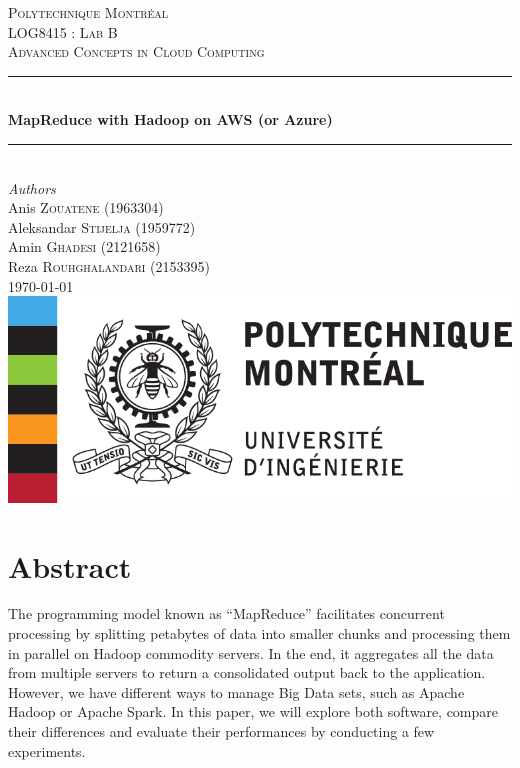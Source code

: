 \documentclass[12pt]{article}
\begin{document}
\begin{titlepage} 
	\newcommand{\HRule}{\rule{\linewidth}{0.5mm}}
	\center
	\textsc{\LARGE Polytechnique Montréal}\\[1.5cm]
	\textsc{\Large LOG8415 : Lab B}\\[0.5cm]
	\textsc{\large Advanced Concepts in Cloud Computing}\\[0.5cm]
	\HRule\\[0.4cm]
	{\huge\bfseries MapReduce with Hadoop on AWS (or Azure)}\\[0.4cm]
	\HRule\\[1.5cm]
	{\large\textit{Authors}}\\
	Anis \textsc{Zouatene} (1963304)\\
	Aleksandar \textsc{Stijelja} (1959772)\\
	Amin \textsc{Ghadesi} (2121658)\\
    Reza \textsc{Rouhghalandari} (2153395)\\
	\vfill\vfill\vfill {\large\today} \vfill\vfill
	\includegraphics{images/poly-logo.png}\\[1cm]
	\vfill
\end{titlepage}


\section{Abstract}

\noindent The programming model known as “MapReduce” facilitates concurrent processing by splitting petabytes of data into smaller chunks and processing them in parallel on Hadoop commodity servers. In the end, it aggregates all the data from multiple servers to return a consolidated output back to the application. \\
\noindent However, we have different ways to manage Big Data sets, such as Apache Hadoop or Apache Spark. In this paper, we will explore both software, compare their differences and evaluate their performances by conducting a few experiments.
\end{document}
